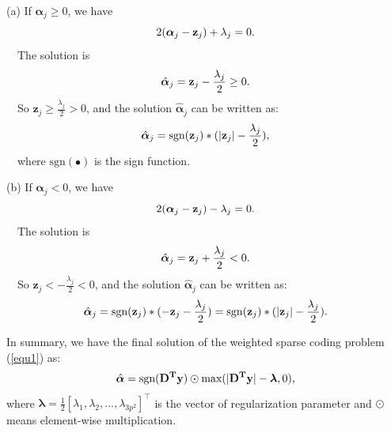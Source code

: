 \documentclass[10pt,onecolumn,letterpaper]{article}
\begin{document}
(a) If $\bm{\alpha}_{j}\ge 0$, we have
\vspace{-1mm}
\begin{equation}\label{equ5}\vspace{-1mm}
2(\bm{\alpha}_{j}-\mathbf{z}_{j})+\lambda_{j}=0.
\end{equation}
\qquad\ \  The solution is
\vspace{-1mm}
\begin{equation}\label{equ6}\vspace{-1mm}
\hat{\bm{\alpha}}_{j}=\mathbf{z}_{j}-\frac{\lambda_{j}}{2} \ge 0.
\end{equation}
\qquad\ \  So $\mathbf{z}_{j}\ge\frac{\lambda_{j}}{2}> 0$, and the solution $\hat{\bm{\alpha}}_{j}$ can be written as:
\vspace{-2mm}
\begin{equation}\label{equ7}\vspace{-2mm}
\hat{\bm{\alpha}}_{j}=\text{sgn}(\mathbf{z}_{j})*(|\mathbf{z}_{j}|-\frac{\lambda_{j}}{2}),
\end{equation}
\qquad\ \  where $\text{sgn}(\bullet)$ is the sign function. 

(b) If $\bm{\alpha}_{j}< 0$, we have
\vspace{-1mm}
\begin{equation}\label{equ8}\vspace{-1mm}
2(\bm{\alpha}_{j}-\mathbf{z}_{j})-\lambda_{j}=0.
\end{equation}
\qquad\ \  The solution is
\vspace{-2mm}
\begin{equation}\label{equ9}\vspace{-2mm}
\hat{\bm{\alpha}}_{j}=\mathbf{z}_{j}+\frac{\lambda_{j}}{2} < 0.
\end{equation}
\qquad\ \  So $\mathbf{z}_{j}<-\frac{\lambda_{j}}{2}< 0$, and the solution $\hat{\bm{\alpha}}_{j}$ can be written as:
\vspace{-1mm}
\begin{equation}\label{equ10}\vspace{-1mm}
\hat{\bm{\alpha}}_{j}=\text{sgn}(\mathbf{z}_{j})*(-\mathbf{z}_{j}-\frac{\lambda_{j}}{2})=\text{sgn}(\mathbf{z}_{j})*(|\mathbf{z}_{j}|-\frac{\lambda_{j}}{2}).
\end{equation} 

In summary, we have the final solution of the weighted sparse coding problem (\ref{equ1}) as:
\vspace{-1mm}
\begin{equation}\label{equ11}\vspace{-1mm}
\hat{\bm{\alpha}}= \text{sgn}(\mathbf{D^{T}y})\odot \text{max}(|\mathbf{D^{T}y}|-\bm{\lambda},0),
\end{equation}
where $\bm{\lambda} = \frac{1}{2}[\lambda_{1},\lambda_{2},...,\lambda_{3p^2}]^{\top}$ is the vector of regularization parameter and $\odot$ means element-wise multiplication.
\end{document}
